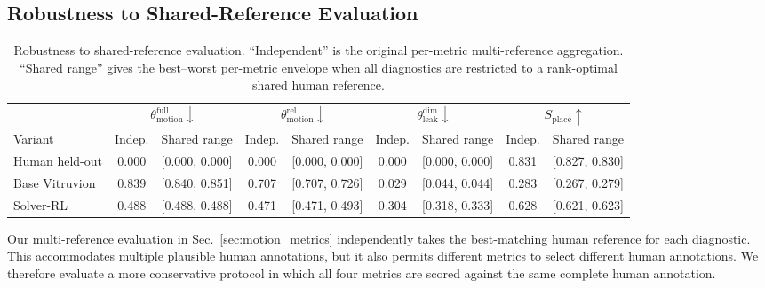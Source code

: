 \subsection{Robustness to Shared-Reference Evaluation}
\label{sec:appendix_shared_reference}

\begin{table}[t]
\centering
\caption{
Robustness to shared-reference evaluation.
``Independent'' is the original per-metric multi-reference aggregation. ``Shared range'' gives the best--worst per-metric envelope when all diagnostics are restricted to a rank-optimal shared human reference.
}
\label{tab:shared_reference}
\small
\setlength{\tabcolsep}{4.2pt}
\begin{tabular}{lcc cc cc cc}
\toprule
&
\multicolumn{2}{c}{$\theta^{\mathrm{full}}_{\mathrm{motion}}\downarrow$} &
\multicolumn{2}{c}{$\theta^{\mathrm{rel}}_{\mathrm{motion}}\downarrow$} &
\multicolumn{2}{c}{$\theta^{\mathrm{dim}}_{\mathrm{leak}}\downarrow$} &
\multicolumn{2}{c}{$S_{\mathrm{place}}\uparrow$} \\
\cmidrule(lr){2-3}
\cmidrule(lr){4-5}
\cmidrule(lr){6-7}
\cmidrule(lr){8-9}
Variant
& Indep. & Shared range
& Indep. & Shared range
& Indep. & Shared range
& Indep. & Shared range \\
\midrule
Human held-out
& 0.000 & [0.000, 0.000]
& 0.000 & [0.000, 0.000]
& 0.000 & [0.000, 0.000]
& 0.831 & [0.827, 0.830] \\

Base Vitruvion
& 0.839 & [0.840, 0.851]
& 0.707 & [0.707, 0.726]
& 0.029 & [0.044, 0.044]
& 0.283 & [0.267, 0.279] \\

Solver-RL
& 0.488 & [0.488, 0.488]
& 0.471 & [0.471, 0.493]
& 0.304 & [0.318, 0.333]
& 0.628 & [0.621, 0.623] \\
\bottomrule
\end{tabular}
\end{table}

Our multi-reference evaluation in Sec.~\ref{sec:motion_metrics} independently takes the best-matching human reference for each diagnostic. This accommodates multiple plausible human annotations, but it also permits different metrics to select different human annotations. We therefore evaluate a more conservative protocol in which all four metrics are scored against the same complete human annotation.

